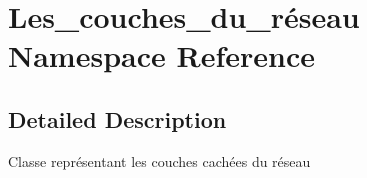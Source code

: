 \hypertarget{namespace_les__couches__du__r_xC3_xA9seau}{}\section{Les\+\_\+couches\+\_\+du\+\_\+réseau Namespace Reference}
\label{namespace_les__couches__du__r_xC3_xA9seau}


\subsection{Detailed Description}
Classe représentant les couches cachées du réseau 
